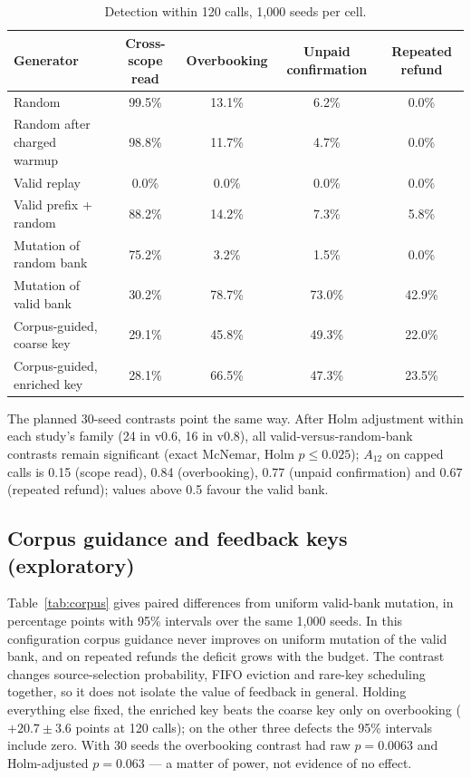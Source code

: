 \documentclass[conference]{IEEEtran}
\begin{document}
\begin{table}[t]
\caption{Detection within 120 calls, 1{,}000 seeds per cell.}
\label{tab:detect}
\centering
\footnotesize
\begin{tabular}{@{}lcccc@{}}
\toprule
Generator & Cross-scope read & Overbooking & Unpaid confirmation & Repeated refund \\
\midrule
Random & 99.5\% & 13.1\% & 6.2\% & 0.0\% \\
Random after charged warmup & 98.8\% & 11.7\% & 4.7\% & 0.0\% \\
Valid replay & 0.0\% & 0.0\% & 0.0\% & 0.0\% \\
Valid prefix + random & 88.2\% & 14.2\% & 7.3\% & 5.8\% \\
Mutation of random bank & 75.2\% & 3.2\% & 1.5\% & 0.0\% \\
Mutation of valid bank & 30.2\% & 78.7\% & 73.0\% & 42.9\% \\
Corpus-guided, coarse key & 29.1\% & 45.8\% & 49.3\% & 22.0\% \\
Corpus-guided, enriched key & 28.1\% & 66.5\% & 47.3\% & 23.5\% \\
\bottomrule
\end{tabular}
\end{table}

The planned 30-seed contrasts point the same way. After Holm adjustment within each
study's family (24 in v0.6, 16 in v0.8), all valid-versus-random-bank contrasts remain
significant (exact McNemar, Holm $p\le0.025$); $A_{12}$ on capped calls is 0.15
(scope read), 0.84 (overbooking), 0.77 (unpaid confirmation) and 0.67 (repeated refund);
values above 0.5 favour the valid bank.

\subsection{Corpus guidance and feedback keys (exploratory)}
Table~\ref{tab:corpus} gives paired differences from uniform valid-bank mutation, in
percentage points with 95\% intervals over the same 1{,}000 seeds. In this configuration
corpus guidance never improves on uniform mutation of the valid bank, and on repeated
refunds the deficit grows with the budget. The contrast changes source-selection
probability, FIFO eviction and rare-key scheduling together, so it does not isolate the
value of feedback in general. Holding everything else fixed, the enriched key beats the
coarse key only on overbooking ($+20.7\pm3.6$ points at 120 calls); on the other three
defects the 95\% intervals include zero. With 30 seeds the overbooking contrast had raw
$p=0.0063$ and Holm-adjusted $p=0.063$ --- a matter of power, not evidence of no effect.
\end{document}
